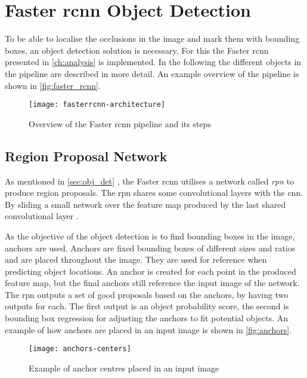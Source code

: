 \section{Faster \gls{rcnn} Object Detection}
To be able to localise the occlusions in the image and mark them with bounding boxes, an object detection solution is necessary. For this the Faster \gls{rcnn} presented in \autoref{ch:analysis} is implemented. In the following the different objects in the pipeline are described in more detail. An example overview of the pipeline is shown in \autoref{fig:faster_rcnn}.

\begin{figure}[H]
	\centering
	\texttt{[image: fasterrcnn-architecture]}
	\caption{Overview of the Faster \gls{rcnn} pipeline and its steps \citep{Rey2018}}
	\label{fig:faster_rcnn}
\end{figure}


\subsection{Region Proposal Network}
As mentioned in \autoref{sec:obj_det} , the Faster \gls{rcnn} utilises a network called \textit{\gls{rpn}} to produce region proposals. The \gls{rpn} shares some convolutional layers with the \gls{cnn}. By sliding a small network over the feature map produced by the last shared convolutional layer \citep{Ren2017}.

As the objective of the object detection is to find bounding boxes in the image, anchors are used. Anchors are fixed bounding boxes of different sizes and ratios and are placed throughout the image. They are used for reference when predicting object locations. An anchor is created for each point in the produced feature map, but the final anchors still reference the input image of the network. The \gls{rpn} outputs a set of good proposals based on the anchors, by having two outputs for each. The first output is an object probability score, the second is bounding box regression for adjusting the anchors to fit potential objects. An example of how anchors are placed in an input image is shown in \autoref{fig:anchors}.

\begin{figure}[H]
	\centering
	\texttt{[image: anchors-centers]}
	\caption{Example of anchor centres placed in an input image \citep{Rey2018}}
	\label{fig:anchors}
\end{figure}

